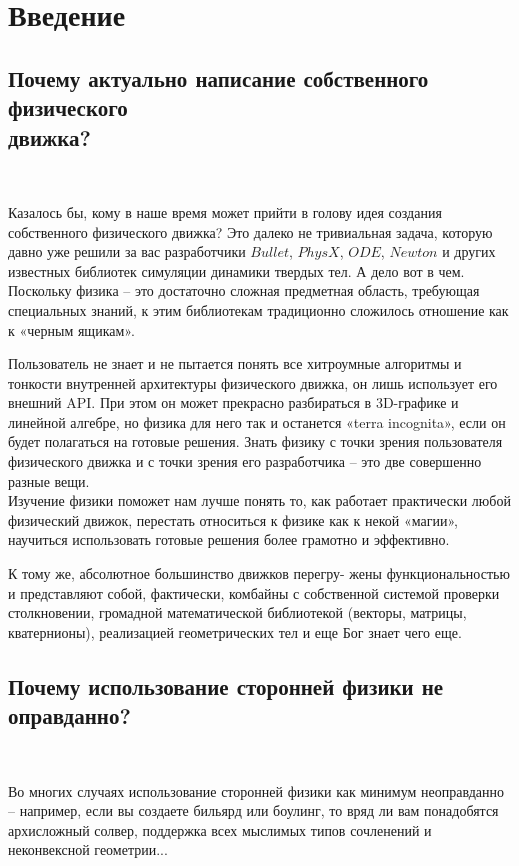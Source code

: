 \chapter{Введение}

\section{Почему актуально написание собственного физического \\ движка?} 
\

Казалось бы, кому в наше время может прийти в голову
идея создания собственного физического движка? Это далеко не
тривиальная задача, которую давно уже решили за вас
разработчики $Bullet$, $PhysX$, $ODE$, $Newton$ и других известных
библиотек симуляции динамики твердых тел. А дело вот в чем.
\\

Поскольку физика – это достаточно сложная предметная
область, требующая специальных знаний, к этим библиотекам
традиционно сложилось отношение как к «черным ящикам».

Пользователь не знает и не пытается понять все хитроумные
алгоритмы и тонкости внутренней архитектуры физического
движка, он лишь использует его внешний API. При этом он
может прекрасно разбираться в 3D-графике и линейной
алгебре, но физика для него так и останется «terra incognita»,
если он будет полагаться на готовые решения.
Знать физику с точки зрения пользователя физического
движка и с точки зрения его разработчика – это две совершенно
разные вещи.
\\

Изучение физики поможет нам лучше понять то,
как работает практически любой физический движок, перестать
относиться к физике как к некой «магии», научиться
использовать готовые решения более грамотно и эффективно.

К тому же, абсолютное большинство движков перегру-
жены функциональностью и представляют собой, фактически,
комбайны с собственной системой проверки столкновении,
громадной математической библиотекой (векторы, матрицы,
кватернионы), реализацией геометрических тел и еще Бог знает
чего еще. 

\section{Почему использование сторонней физики не оправданно?} 
\

Во многих случаях использование сторонней
физики как минимум неоправданно – например, если вы
создаете бильярд или боулинг, то вряд ли вам понадобятся
архисложный солвер, поддержка всех мыслимых типов
сочленений и неконвексной геометрии...

